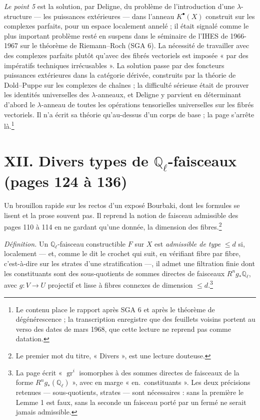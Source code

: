 \documentclass[11pt,a4paper]{article}
\begin{document}
\emph{Le point 5} est la solution, par Deligne, du problème de l'introduction d'une
$\lambda$-structure --- les puissances extérieures --- dans l'anneau $K^{\bullet}(X)$
construit sur les complexes parfaits, pour un espace localement annelé ; il était
signalé comme le plus important problème resté en suspens dans le séminaire de
l'IHES de 1966-1967 sur le théorème de Riemann--Roch (SGA 6). La nécessité de
travailler avec des complexes parfaits plutôt qu'avec des fibrés vectoriels est
imposée « par des impératifs techniques irrécusables ». La solution passe par des
foncteurs puissances extérieures dans la catégorie dérivée, construits par la
théorie de Dold--Puppe sur les complexes de chaînes ; la difficulté sérieuse était
de prouver les identités universelles des $\lambda$-anneaux, et Deligne y parvient
en déterminant d'abord le $\lambda$-anneau de toutes les opérations tensorielles
universelles sur les fibrés vectoriels. Il n'a écrit sa théorie qu'au-dessus d'un
corps de base ; la page s'arrête là.\footnote{Le contenu place le rapport après
SGA 6 et après le théorème de dégénérescence ; la transcription enregistre que des
feuillets voisins portent au verso des dates de mars 1968, que cette lecture ne
reprend pas comme datation.}

\section*{XII. Divers types de $\mathbb{Q}_{\ell}$-faisceaux (pages 124 à 136)}

Un brouillon rapide sur les rectos d'un exposé Bourbaki, dont les formules se
lisent et la prose souvent pas. Il reprend la notion de faisceau admissible des
pages 110 à 114 en ne gardant qu'une donnée, la dimension des fibres.\footnote{Le
premier mot du titre, « Divers », est une lecture douteuse.}

\emph{Définition.} Un $\mathbb{Q}_{\ell}$-faisceau constructible $F$ sur $X$ est
\emph{admissible de type} $\leqslant d$ si, localement --- et, comme le dit le
crochet qui suit, en vérifiant fibre par fibre, c'est-à-dire sur les strates d'une
stratification ---, il admet une filtration finie dont les constituants sont des
sous-quotients de sommes directes de faisceaux $R^{n}g_{*}\mathbb{Q}_{\ell}$, avec $g
\colon V \to U$ projectif et lisse à fibres connexes de dimension $\leqslant
d$.\footnote{La page écrit « $\operatorname{gr}^{i}$ isomorphes à des sommes
directes de faisceaux de la forme $R^{n}g_{*}(\mathbb{Q}_{\ell})$ », avec en marge
« en.\ constituants ». Les deux précisions retenues --- sous-quotients, strates ---
sont nécessaires : sans la première le Lemme 1 est faux, sans la seconde un
faisceau porté par un fermé ne serait jamais admissible.}
\end{document}
